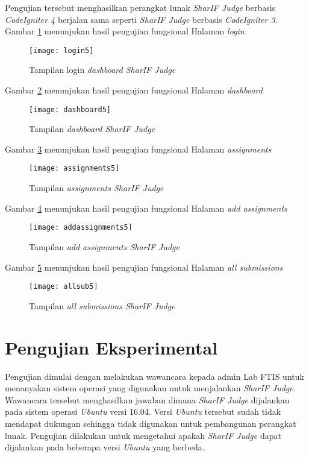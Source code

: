 Pengujian tersebut menghasilkan perangkat lunak \textit{SharIF Judge} berbasis \textit{CodeIgniter 4} berjalan sama seperti \textit{SharIF Judge} berbasis \textit{CodeIgniter 3}. Gambar \ref{fig:login5} menunjukan hasil pengujian fungsional Halaman \textit{login}
\begin{figure}[H]
	\centering  
	\texttt{[image: login5]}  
	\caption[Tampilan halaman \textit{login SharIF Judge}]{Tampilan login \textit{dashboard SharIF Judge}} 
	\label{fig:login5} 
\end{figure} 

Gambar \ref{fig:dashboard5} menunjukan hasil pengujian fungsional Halaman \textit{dashboard}
\begin{figure}[H]
	\centering  
	\texttt{[image: dashboard5]}  
	\caption[Tampilan halaman \textit{dashboard SharIF Judge}]{Tampilan \textit{dashboard SharIF Judge}} 
	\label{fig:dashboard5} 
\end{figure} 

Gambar \ref{fig:assignments5} menunjukan hasil pengujian fungsional Halaman \textit{assignments}
\begin{figure}[H]
	\centering  
	\texttt{[image: assignments5]}  
	\caption[Tampilan halaman \textit{assignments SharIF Judge}]{Tampilan  \textit{assignments SharIF Judge}} 
	\label{fig:assignments5} 
\end{figure} 

Gambar \ref{fig:addassignments5} menunjukan hasil pengujian fungsional Halaman \textit{add assignments}
\begin{figure}[H]
	\centering  
	\texttt{[image: addassignments5]}  
	\caption[Tampilan halaman \textit{add assignments SharIF Judge}]{Tampilan  \textit{add assignments SharIF Judge}} 
	\label{fig:addassignments5} 
\end{figure} 

Gambar \ref{fig:allsub5} menunjukan hasil pengujian fungsional Halaman \textit{all submissions}
\begin{figure}[H]
	\centering  
	\texttt{[image: allsub5]}  
	\caption[Tampilan halaman \textit{all submissions SharIF Judge}]{Tampilan  \textit{all submissions SharIF Judge}} 
	\label{fig:allsub5} 
\end{figure} 

\section{Pengujian Eksperimental}
Pengujian dimulai dengan melakukan wawancara kepada admin Lab FTIS untuk menanyakan sistem operasi yang digunakan untuk menjalankan \textit{SharIF Judge}. Wawancara tersebut menghasilkan jawaban dimana \textit{SharIF Judge} dijalankan pada sistem operasi \textit{Ubuntu} versi 16.04. Versi \textit{Ubuntu} tersebut sudah tidak mendapat dukungan sehingga tidak digunakan untuk pembangunan perangkat lunak. Pengujian dilakukan untuk mengetahui apakah \textit{SharIF Judge} dapat dijalankan pada beberapa versi \textit{Ubuntu} yang berbeda. 

